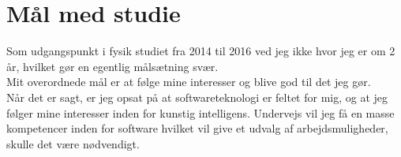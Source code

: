 \section{Mål med studie}

Som udgangspunkt i fysik studiet fra 2014 til 2016 ved jeg ikke hvor jeg er om 2 år, hvilket gør en egentlig målsætning svær. \\

Mit overordnede mål er at følge mine interesser og blive god til det jeg gør. \\

Når det er sagt, er jeg opsat på at softwareteknologi er feltet for mig, og at jeg følger mine interesser inden for kunstig intelligens. Undervejs vil jeg få en masse kompetencer inden for software hvilket vil give et udvalg af arbejdsmuligheder, skulle det være nødvendigt.